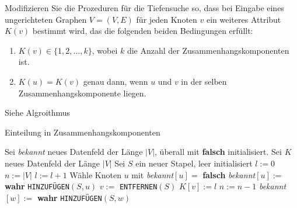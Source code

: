 
\begin{exercise}

\phantom{}

	Modifizieren Sie die Prozeduren für die Tiefensuche so, dass bei Eingabe eines ungerichteten Graphen $V = (V, E)$ für jeden Knoten $v$ ein weiteres Attribut $K(v)$ bestimmt wird, das die folgenden beiden Bedingungen erfüllt:
	\begin{enumerate}[label = (\alph*)]
		\item $K(v) \in \{1,2,\dots,k\}$, wobei $k$ die Anzahl der Zusammenhangskomponenten ist.
		
		\item $K(u) = K(v)$ genau dann, wenn $u$ und $v$ in der selben Zusammenhangskomponente liegen. 
	\end{enumerate}
	

\end{exercise}


\begin{solution}

\phantom{}
Siehe Algroithmus

	\begin{algorithm}
		\caption{Einteilung in Zusammenhangskomponenten} 
		\begin{algorithmic}[1]
			\State Sei \textit{bekannt} neues Datenfeld der Länge $|V|$, überall mit \textbf{falsch} initialisiert.
			\State Sei $K$ neues Datenfeld der Länge $|V|$
			\State Sei $S$ ein neuer Stapel, leer initialisiert
			\State $l := 0$
			\State $n := |V|$
			\State $l := l + 1$
			\State Wähle Knoten $u$ mit \textit{bekannt}$[u] =$ \textbf{falsch}
			\State \textit{bekannt}$[u] :=$ \textbf{wahr}
			\State \verb|HINZUFÜGEN|$(S,u)$ 
			\State $v :=$ \verb|ENTFERNEN|$(S)$
			\State $K[v] := l$
			\State $n := n - 1$
			\State  \textit{bekannt}$[w] :=$ \textbf{wahr}
			\State \verb|HINZUFÜGEN|$(S,w)$
			\EndIf
			\EndFor
			\EndWhile
			\EndWhile
			\EndProcedure
		\end{algorithmic}
	\end{algorithm}

\end{solution}

